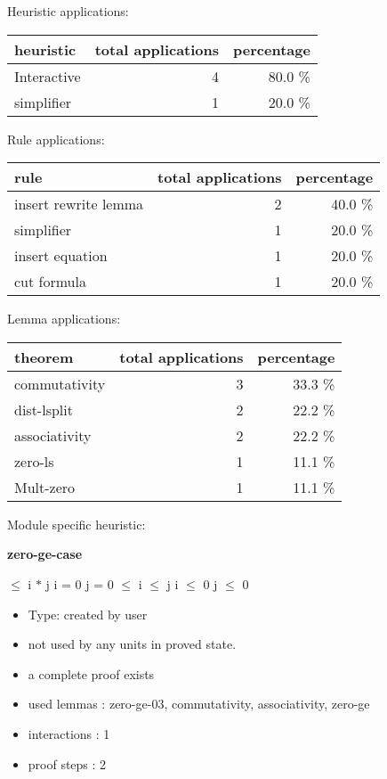 \documentclass[a4paper]{article}
\begin{document}
\medskip


Heuristic applications:

\begin{supertabular}{l|r|r}
heuristic	& total applications & percentage \\ \hline
Interactive & 4 & 80.0 \% \\
simplifier & 1 & 20.0 \% \\

\end{supertabular}

Rule applications:

\begin{supertabular}{l|r|r}
rule	        & total applications & percentage \\ \hline
insert rewrite lemma & 2 & 40.0 \% \\
simplifier & 1 & 20.0 \% \\
insert equation & 1 & 20.0 \% \\
cut formula & 1 & 20.0 \% \\

\end{supertabular}

Lemma applications:

\begin{supertabular}{l|r|r}
theorem	        & total applications & percentage \\ \hline
commutativity & 3 & 33.3 \% \\
dist-lsplit & 2 & 22.2 \% \\
associativity & 2 & 22.2 \% \\
zero-ls & 1 & 11.1 \% \\
Mult-zero & 1 & 11.1 \% \\

\end{supertabular}

Module specific heuristic:

\pagebreak

{\LARGE\bf zero-ge-case}\label{lemma-zero-ge-case}

\medskip

  $\le$ i $*$ j \Equiv i = 0 \Or j = 0  $\le$ i  $\le$ j \Or i $\le$ 0 \And j $\le$ 0

\begin{itemize}

\item Type: created by user

\item not used by any units in proved state.
\item       a complete proof exists
\item       used lemmas  : zero-ge-03, commutativity, associativity, zero-ge
\item       interactions : 1
\item       proof steps  : 2
\end{itemize}
\end{document}
